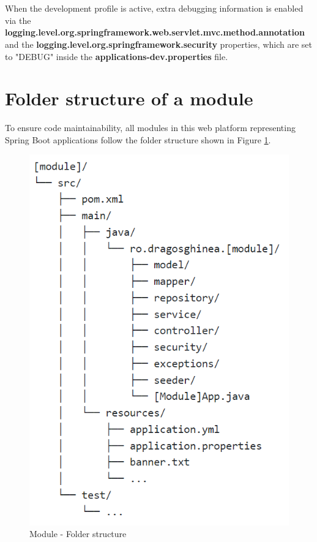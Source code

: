 \\\\
\noindent When the development profile is active, extra debugging information is enabled via the \textbf{logging.level.org.springframework.web.servlet.mvc.method.annotation} and the
\textbf{logging.level.org.springframework.security} properties, which are set to "DEBUG" inside the \textbf{applications-dev.properties} file.

\section{Folder structure of a module}

To ensure code maintainability, all modules in this web platform representing Spring Boot applications follow the folder structure shown in Figure \ref{fig:figure3}.

\begin{figure}[h]
    \centering
    \includegraphics[scale=0.7]{images/module-folder-structure.png}
    \caption{Module - Folder structure}
    \label{fig:figure3}
\end{figure}


